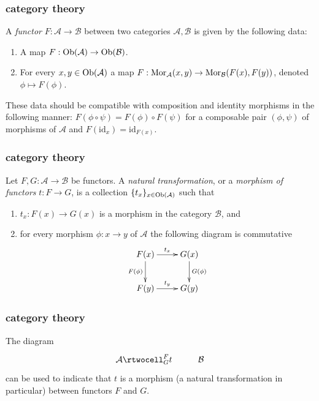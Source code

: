 \begin{frame}
\frametitle{category theory}
	\begin{definition}
		\label{definition-functor}
		A {\it functor} $F : \mathcal{A} \to \mathcal{B}$
		between two categories $\mathcal{A}, \mathcal{B}$ is given by the
		following data:
		\begin{enumerate}
			\pause \item A map $F : \mathop{\rm Ob}\nolimits(\mathcal{A}) \to \mathop{\rm Ob}\nolimits(\mathcal{B})$.
			\pause \item For every $x, y \in \mathop{\rm Ob}\nolimits(\mathcal{A})$ a map
			$F : \mathop{\rm Mor}\nolimits_\mathcal{A}(x, y) \to \mathop{\rm Mor}\nolimits_\mathcal{B}(F(x), F(y))$,
			denoted $\phi \mapsto F(\phi)$.
		\end{enumerate}
		\pause These data should be compatible with composition and identity morphisms
		in the following manner: $F(\phi \circ \psi) =
		F(\phi) \circ F(\psi)$ for a composable pair $(\phi, \psi)$ of
		morphisms of $\mathcal{A}$ and $F(\text{id}_x) = \text{id}_{F(x)}$.
	\end{definition}
\end{frame}

\begin{frame}
\frametitle{category theory}
	\begin{definition}
	\label{definition-transformation-functors}
		Let $F, G : \mathcal{A} \to \mathcal{B}$ be functors.
		A {\it natural transformation}, or a {\it morphism of functors}
		$t : F \to G$, is a collection $\{t_x\}_{x\in \mathop{\rm Ob}\nolimits(\mathcal{A})}$
		such that
		\begin{enumerate}
			\item $t_x : F(x) \to G(x)$ is a morphism in the category $\mathcal{B}$, and
			\item for every morphism $\phi : x \to y$ of $\mathcal{A}$ the following
			diagram is commutative
			$$
			\xymatrix{
			F(x) \ar[r]^{t_x} \ar[d]_{F(\phi)} & G(x) \ar[d]^{G(\phi)} \\
			F(y) \ar[r]^{t_y} & G(y) }
			$$
		\end{enumerate}
	\end{definition}
\end{frame}

\begin{frame}
\frametitle{category theory}
	The diagram
	$$
	\xymatrix{
	\mathcal{A}
	\rtwocell^F_G{t}
	&
	\mathcal{B}
	}
	$$
	can be used to indicate that $t$ is a morphism (a natural transformation in particular) between functors $F$ and $G$.
\end{frame}

